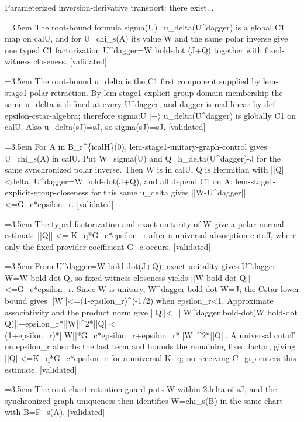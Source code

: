 \documentclass{article}
\newcommand{\step}[1]{\par\noindent\hangindent=3.5em\hangafter=1%
  \makebox[3.5em][l]{\textbf{#1.}}}
\newcommand{\steptag}[1]{\hfill{\small\textsf{[#1]}}}
\begin{document}
\begin{proofbox}{Parameterized inversion-derivative transport: there exist...}
\step{1.4} The root-bound formula sigma(U)=u\_delta(U\textasciicircum{}dagger) is a global C1 map on calU, and for U=chi\_s(A) its value W and the same polar inverse give one typed C1 factorization U\textasciicircum{}dagger=W bold-dot (J+Q) together with fixed-witness closeness. \steptag{validated} \\[6pt]
\step{1.4.1} The root-bound u\_delta is the C1 first component supplied by lem-stage1-polar-retraction. By lem-stage1-explicit-group-domain-membership the same u\_delta is defined at every U\textasciicircum{}dagger, and dagger is real-linear by def-epsilon-cstar-algebra; therefore sigma:U $|-\rangle$ u\_delta(U\textasciicircum{}dagger) is globally C1 on calU. Also u\_delta(sJ)=sJ, so sigma(sJ)=sJ. \steptag{validated} \\[4pt]
\step{1.4.2} For A in B\_r\textasciicircum{}\{icalH\}(0), lem-stage1-unitary-graph-control gives U=chi\_s(A) in calU. Put W=sigma(U) and Q=h\_delta(U\textasciicircum{}dagger)-J for the same synchronized polar inverse. Then W is in calU, Q is Hermitian with ||Q||<delta, U\textasciicircum{}dagger=W bold-dot(J+Q), and all depend C1 on A; lem-stage1-explicit-group-closeness for this same u\_delta gives ||W-U\textasciicircum{}dagger||<=G\_c*epsilon\_r. \steptag{validated} \\[4pt]
\step{1.5} The typed factorization and exact unitarity of W give a polar-normal estimate ||Q|| <= K\_q*G\_c*epsilon\_r after a universal absorption cutoff, where only the fixed provider coefficient G\_c occurs. \steptag{validated} \\[6pt]
\step{1.5.1} From U\textasciicircum{}dagger=W bold-dot(J+Q), exact unitality gives U\textasciicircum{}dagger-W=W bold-dot Q, so fixed-witness closeness yields ||W bold-dot Q||<=G\_c*epsilon\_r. Since W is unitary, W\textasciicircum{}dagger bold-dot W=J; the Cstar lower bound gives ||W||<=(1-epsilon\_r)\textasciicircum{}(-1/2) when epsilon\_r<1. Approximate associativity and the product norm give ||Q||<=||W\textasciicircum{}dagger bold-dot(W bold-dot Q)||+epsilon\_r*||W||\textasciicircum{}2*||Q||<=(1+epsilon\_r)*||W||*G\_c*epsilon\_r+epsilon\_r*||W||\textasciicircum{}2*||Q||. A universal cutoff on epsilon\_r absorbs the last term and bounds the remaining fixed factor, giving ||Q||<=K\_q*G\_c*epsilon\_r for a universal K\_q; no receiving C\_grp enters this estimate. \steptag{validated} \\[4pt]
\step{1.6} The root chart-retention guard puts W within 2delta of sJ, and the synchronized graph uniqueness then identifies W=chi\_s(B) in the same chart with B=F\_s(A). \steptag{validated} \\[6pt]

\end{proofbox}
\end{document}
